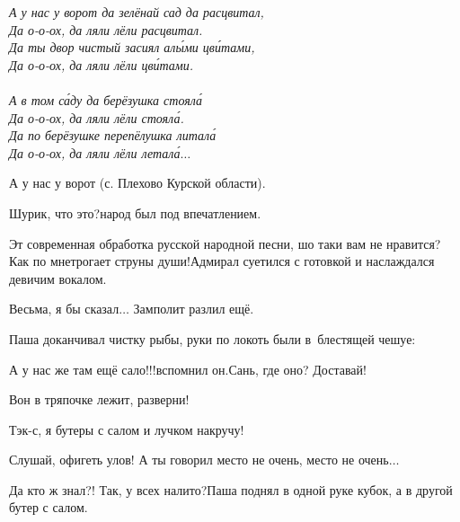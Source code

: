 \vspace{0.2cm}
\noindent\textit{%
	\hspace*{1.5cm}А у нас у ворот да зелёнай сад да расцвитал,\\
	\hspace*{1.5cm}Да о-о-ох, да ляли лёли расцвитал.\\
	\hspace*{1.5cm}Да ты двор чистый засиял ал{\'ы}ми цв{\'и}тами,\\
	\hspace*{1.5cm}Да о-о-ох, да ляли лёли цв{\'и}тами.\\
	\\
	\hspace*{1.5cm}А в том с{\'а}ду да берёзушка стоял{\'а}\\
	\hspace*{1.5cm}Да о-о-ох, да ляли лёли стоял{\'а}.\\
	\hspace*{1.5cm}Да по берёзушке перепёлушка литал{\'а}\\
	\hspace*{1.5cm}Да о-о-ох, да ляли лёли летал{\'а}$\ldots$
}

{\raggedleft \scriptsize \mdash А у нас у ворот (с. Плехово Курской области). \par}

\vspace{0.1cm}

\diagdash Шурик, что это?\mdash народ был под впечатлением.

\diagdash Эт современная обработка русской народной песни, шо таки вам не нравится? Как по мне\mdash трогает струны души!\mdash Адмирал суетился с готовкой и наслаждался девичим вокалом.

\diagdash Весьма, я бы сказал$\ldots$ \mdash Замполит разлил ещё.

Паша доканчивал чистку рыбы, руки по локоть были в~блестящей чешуе:

\diagdash А у нас же там ещё сало!!!\mdash вспомнил он.\mdash Сань, где оно? Доставай!

\diagdash Вон в тряпочке лежит, разверни!

\diagdash Тэк-с, я бутеры с салом и лучком накручу!

\diagdash Слушай, офигеть улов! А ты говорил место не очень, место не очень$\ldots$

\diagdash Да кто ж знал?! Так, у всех налито?\mdash Паша поднял в одной руке кубок, а в другой бутер с салом.

